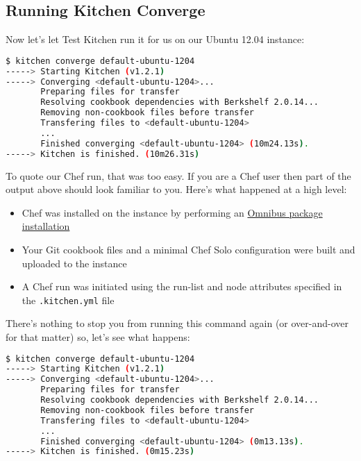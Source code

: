 \subsection{Running Kitchen Converge}

Now let's let Test Kitchen run it for us on our Ubuntu 12.04 instance:

\begin{lstlisting}[language=Bash,label=lst:testing-test-kitchen9]
$ kitchen converge default-ubuntu-1204
-----> Starting Kitchen (v1.2.1)
-----> Converging <default-ubuntu-1204>...
       Preparing files for transfer
       Resolving cookbook dependencies with Berkshelf 2.0.14...
       Removing non-cookbook files before transfer
       Transfering files to <default-ubuntu-1204>
       ...
       Finished converging <default-ubuntu-1204> (10m24.13s).
-----> Kitchen is finished. (10m26.31s)
\end{lstlisting}

To quote our Chef run, that was too easy. If you are a Chef user then part of the output above should look familiar to you. Here's what happened at a high level:

\begin{itemize}
  \item Chef was installed on the instance by performing an \href{http://www.opscode.com/chef/install/}{Omnibus package installation}
  \item Your Git cookbook files and a minimal Chef Solo configuration were built and uploaded to the instance
  \item A Chef run was initiated using the run-list and node attributes specified in the \lstinline!.kitchen.yml! file
\end{itemize}

There's nothing to stop you from running this command again (or over-and-over for that matter) so, let's see what happens:

\begin{lstlisting}[language=Bash,label=lst:testing-test-kitchen10]
$ kitchen converge default-ubuntu-1204
-----> Starting Kitchen (v1.2.1)
-----> Converging <default-ubuntu-1204>...
       Preparing files for transfer
       Resolving cookbook dependencies with Berkshelf 2.0.14...
       Removing non-cookbook files before transfer
       Transfering files to <default-ubuntu-1204>
       ...
       Finished converging <default-ubuntu-1204> (0m13.13s).
-----> Kitchen is finished. (0m15.23s)
\end{lstlisting}

